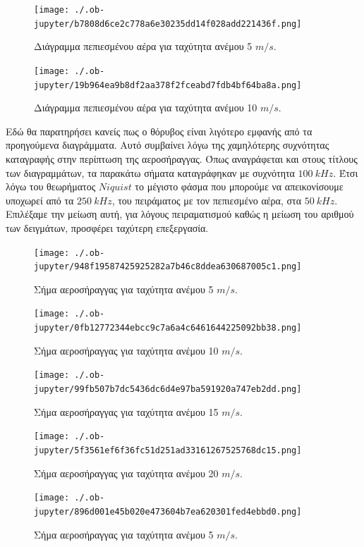 \documentclass[breaklines=true, 12pt]{article}
\begin{document}
\begin{figure}[htbp]
\centering
\texttt{[image: ./.ob-jupyter/b7808d6ce2c778a6e30235dd14f028add221436f.png]}
\caption{\label{ic1_5}Διάγραμμα πεπιεσμένου αέρα για ταχύτητα ανέμου 5 \(m/s\).}
\end{figure}

\begin{figure}[htbp]
\centering
\texttt{[image: ./.ob-jupyter/19b964ea9b8df2aa378f2fceabd7fdb4bf64ba8a.png]}
\caption{\label{ic1_10}Διάγραμμα πεπιεσμένου αέρα για ταχύτητα ανέμου 10 \(m/s\).}
\end{figure}
\clearpage

Εδώ θα παρατηρήσει κανείς πως ο θόρυβος είναι λιγότερο εμφανής από τα
προηγούμενα διαγράμματα. Αυτό συμβαίνει λόγω της χαμηλότερης συχνότητας
καταγραφής στην περίπτωση της αεροσήραγγας. Όπως αναγράφεται και στους
τίτλους των διαγραμμάτων, τα παρακάτω σήματα καταγράφηκαν με συχνότητα
\(100\ kHz\). Έτσι λόγω του θεωρήματος \(Niquist\) το μέγιστο φάσμα που
μπορούμε να απεικονίσουμε υποχωρεί από τα \(250\ kHz\), του πειράματος με
τον πεπιεσμένο αέρα, στα \(50\ kHz\). Επιλέξαμε την μείωση αυτή, για
λόγους πειραματισμού καθώς η μείωση του αριθμού των δειγμάτων, προσφέρει
ταχύτερη επεξεργασία.
\begin{figure}[htbp]
\centering
\texttt{[image: ./.ob-jupyter/948f19587425925282a7b46c8ddea630687005c1.png]}
\caption{\label{fi1_5}Σήμα αεροσήραγγας για ταχύτητα ανέμου 5 \(m/s\).}
\end{figure}

\begin{figure}[htbp]
\centering
\texttt{[image: ./.ob-jupyter/0fb12772344ebcc9c7a6a4c6461644225092bb38.png]}
\caption{\label{fi1_10}Σήμα αεροσήραγγας για ταχύτητα ανέμου 10 \(m/s\).}
\end{figure}

\begin{figure}[htbp]
\centering
\texttt{[image: ./.ob-jupyter/99fb507b7dc5436dc6d4e97ba591920a747eb2dd.png]}
\caption{\label{fi1_15}Σήμα αεροσήραγγας για ταχύτητα ανέμου 15 \(m/s\).}
\end{figure}

\begin{figure}[htbp]
\centering
\texttt{[image: ./.ob-jupyter/5f3561ef6f36fc51d251ad33161267525768dc15.png]}
\caption{\label{fi1_w20}Σήμα αεροσήραγγας για ταχύτητα ανέμου 20 \(m/s\).}
\end{figure}

\begin{figure}[htbp]
\centering
\texttt{[image: ./.ob-jupyter/896d001e45b020e473604b7ea620301fed4ebbd0.png]}
\caption{\label{ii1_w5}Σήμα αεροσήραγγας για ταχύτητα ανέμου 5 \(m/s\).}
\end{figure}
\end{document}
